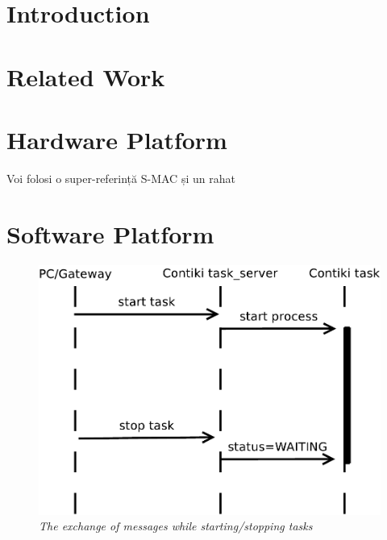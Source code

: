 \documentclass[11pt, oneside, a4paper, oldfontcommands]{memoir}
\begin{document}
\frontmatter


\mainmatter

\chapter{Introduction}
\chapter{Related Work}
\chapter{Hardware Platform}
Voi folosi o super-referință S-MAC\cite{hui} și un rahat \cite{rahat2001candidate}
\chapter{Software Platform}
\begin{figure}[ht]
 \begin{center}
  \includegraphics[scale=0.5]{img/starttask.pdf}
 \end{center}
 \caption{\small \itshape{The exchange of messages while starting/stopping tasks}}
\end{figure}
\end{document}
